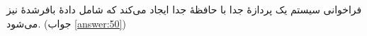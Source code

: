 \section{}
\paragraph{}\label{hint:252}
فراخوانی سیستم  یک پردازهٔ جدا با حافظهٔ جدا ایجاد می‌کند که شامل دادهٔ بافرشدهٔ  نیز می‌شود. (جواب \ref{answer:50})